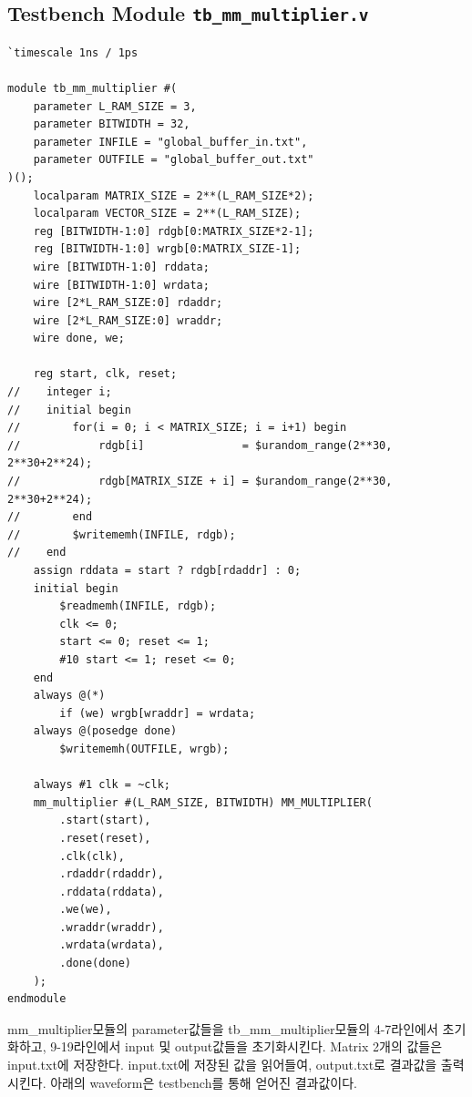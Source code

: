 \documentclass{article}
\begin{document}
\subsection*{Testbench Module \texttt{tb\_mm\_multiplier.v}}
\begin{lstlisting}[style={verilog-style}]
`timescale 1ns / 1ps

module tb_mm_multiplier #(
    parameter L_RAM_SIZE = 3,
    parameter BITWIDTH = 32,
    parameter INFILE = "global_buffer_in.txt",
    parameter OUTFILE = "global_buffer_out.txt"
)();
    localparam MATRIX_SIZE = 2**(L_RAM_SIZE*2);
    localparam VECTOR_SIZE = 2**(L_RAM_SIZE);
    reg [BITWIDTH-1:0] rdgb[0:MATRIX_SIZE*2-1];
    reg [BITWIDTH-1:0] wrgb[0:MATRIX_SIZE-1];
    wire [BITWIDTH-1:0] rddata;
    wire [BITWIDTH-1:0] wrdata;
    wire [2*L_RAM_SIZE:0] rdaddr;
    wire [2*L_RAM_SIZE:0] wraddr;
    wire done, we;
    
    reg start, clk, reset;
//    integer i;
//    initial begin
//        for(i = 0; i < MATRIX_SIZE; i = i+1) begin
//            rdgb[i]               = $urandom_range(2**30, 2**30+2**24);
//            rdgb[MATRIX_SIZE + i] = $urandom_range(2**30, 2**30+2**24);
//        end
//        $writememh(INFILE, rdgb);
//    end
    assign rddata = start ? rdgb[rdaddr] : 0;
    initial begin
        $readmemh(INFILE, rdgb);
        clk <= 0;
        start <= 0; reset <= 1;
        #10 start <= 1; reset <= 0;
    end
    always @(*)
        if (we) wrgb[wraddr] = wrdata;
    always @(posedge done)
        $writememh(OUTFILE, wrgb);
    
    always #1 clk = ~clk;
    mm_multiplier #(L_RAM_SIZE, BITWIDTH) MM_MULTIPLIER(
        .start(start),
        .reset(reset),
        .clk(clk),
        .rdaddr(rdaddr),
        .rddata(rddata),
        .we(we),
        .wraddr(wraddr),
        .wrdata(wrdata),
        .done(done)
    );
endmodule
\end{lstlisting}
\newpage
mm\_multiplier모듈의 parameter값들을 tb\_mm\_multiplier모듈의 4-7라인에서 초기화하고, 9-19라인에서 input 및 output값들을 초기화시킨다. Matrix 2개의 값들은 input.txt에 저장한다. input.txt에 저장된 값을 읽어들여, output.txt로 결과값을 출력시킨다. 아래의 waveform은 testbench를 통해 얻어진 결과값이다.
\end{document}
